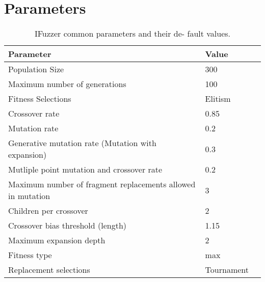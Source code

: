 \documentclass{acm_proc_article-sp}
\begin{document}
\section*{Parameters} \label{AppendixA}
\begin{table}[ht]
\begin{tabular}{ m{7cm}|m{2cm}|@{}m{0cm}@{}}
\hline	
\textbf{Parameter} & \textbf{Value} &\\[15pt]
\hline
Population Size & 300 \\[5pt]
Maximum number of generations & 100 &\\[5pt]
Fitness Selections & Elitism &\\[5pt]
Crossover rate & 0.85 &\\[5pt]
Mutation rate & 0.2 &\\[5pt]
Generative mutation rate \newline (Mutation with expansion) & 0.3 &\\[15pt]
Mutliple point mutation and crossover rate & 0.2 &\\[5pt]
Maximum number of fragment replacements allowed in mutation & 3 &\\[15pt]
Children per crossover & 2 &\\[5pt]
Crossover bias threshold (length) & 1.15 &\\[5pt]
Maximum expansion depth & 2 &\\[5pt]
Fitness type & max &\\[5pt]
Replacement selections & Tournament &\\[5pt]
\hline
\end{tabular}
\caption{IFuzzer common parameters and their de-
fault values.}
\end{table}
\end{document}
